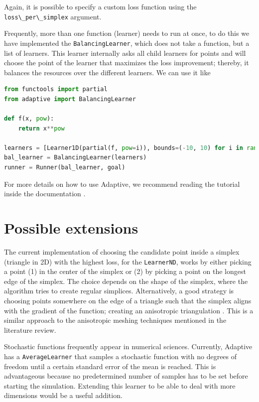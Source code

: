 Again, it is possible to specify a custom loss function using the \passthrough{\lstinline!loss\_per\_simplex!} argument.


Frequently, more than one function (learner) needs to run at once, to do this we have implemented the \passthrough{\lstinline!BalancingLearner!}, which does not take a function, but a list of learners.
This learner internally asks all child learners for points and will choose the point of the learner that maximizes the loss improvement; thereby, it balances the resources over the different learners.
We can use it like

\begin{lstlisting}[language=Python]
from functools import partial
from adaptive import BalancingLearner

def f(x, pow):
    return x**pow

learners = [Learner1D(partial(f, pow=i)), bounds=(-10, 10) for i in range(2, 10)]
bal_learner = BalancingLearner(learners)
runner = Runner(bal_learner, goal)
\end{lstlisting}

For more details on how to use Adaptive, we recommend reading the tutorial inside the documentation \cite{Nijholt2018}.

\section{Possible extensions}


The current implementation of choosing the candidate point inside a simplex (triangle in 2D) with the highest loss, for the \passthrough{\lstinline!LearnerND!}, works by either picking a point (1) in the center of the simplex or (2) by picking a point on the longest edge of the simplex.
The choice depends on the shape of the simplex, where the algorithm tries to create regular simplices.
Alternatively, a good strategy is choosing points somewhere on the edge of a triangle such that the simplex aligns with the gradient of the function; creating an anisotropic triangulation \cite{Dyn1990}.
This is a similar approach to the anisotropic meshing techniques mentioned in the literature review.


Stochastic functions frequently appear in numerical sciences.
Currently, Adaptive has a \passthrough{\lstinline!AverageLearner!} that samples a stochastic function with no degrees of freedom until a certain standard error of the mean is reached.
This is advantageous because no predetermined number of samples has to be set before starting the simulation.
Extending this learner to be able to deal with more dimensions would be a useful addition.

